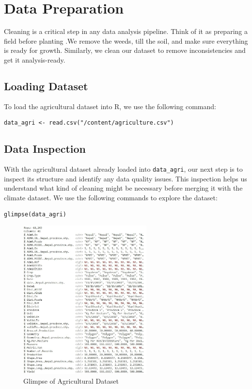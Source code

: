 \section{Data Preparation}

Cleaning is a critical step in any data analysis pipeline. Think of it as preparing a field before planting .We remove the weeds, till the soil, and make sure everything is ready for growth. Similarly, we clean our dataset to remove inconsistencies and get it analysis-ready.

\subsection*{Loading Dataset}
To load the agricultural dataset into R, we use the following command:

\begin{verbatim}
data_agri <- read.csv("/content/agriculture.csv")
\end{verbatim}

\subsection*{Data Inspection}
With the agricultural dataset already loaded into \texttt{data\_agri}, our next step is to inspect its structure and identify any data quality issues. This inspection helps us understand what kind of cleaning might be necessary before merging it with the climate dataset. We use the following commands to explore the dataset:

\begin{verbatim}
glimpse(data_agri)
\end{verbatim}

\begin{figure}[h]
\centering
\includegraphics[width=0.6\textwidth]{figures/agri_glimpse.jpg}
\caption{Glimpse of Agricultural Dataset}
\end{figure}

